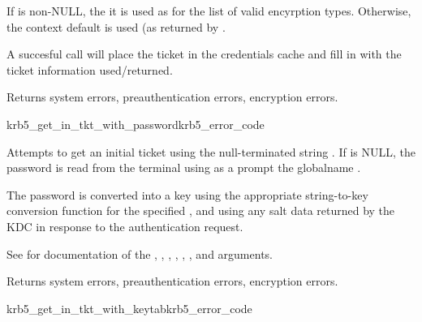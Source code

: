 If  is non-NULL, the it is used as for the list of
valid encyrption types. Otherwise, the context default is used (as
returned by .

A succesful call will place the ticket in the credentials cache
 and fill in  with the ticket
information used/returned.

Returns system errors, preauthentication errors, encryption errors.


\begin{funcdecl}{krb5_get_in_tkt_with_password}{krb5_error_code}{\funcinout}
\funcin
{}
\funcinout
{}
\end{funcdecl}

Attempts to get an initial ticket using the null-terminated string
.  If  is NULL, the password
is read from the terminal using as a prompt the globalname
.  

The password is converted into a key using the appropriate
string-to-key conversion function for the specified
, and using any salt data returned by the KDC in
response to the authentication request.

See  for documentation of the
, , ,
, , ,
 and  arguments.

Returns system errors, preauthentication errors, encryption errors.

\begin{funcdecl}{krb5_get_in_tkt_with_keytab}{krb5_error_code}{\funcinout}
\funcin
{}
\funcinout
{}
\end{funcdecl}

